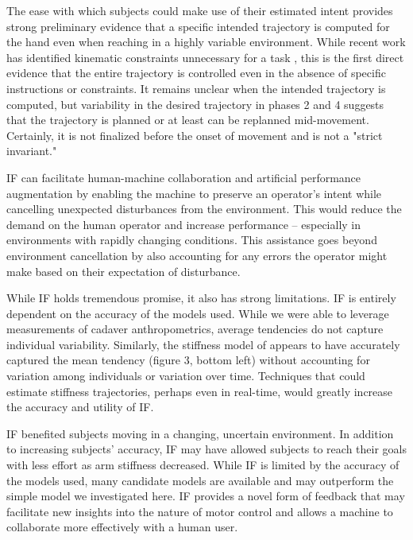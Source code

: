 \documentclass{frontiersSCNS} %
\begin{document}
The ease with which subjects could make use of their estimated intent provides strong preliminary evidence that a specific intended trajectory is computed for the hand even when reaching in a highly variable environment. While recent work has identified kinematic constraints unnecessary for a task \citep{mistry2013optimal}, this is the first direct evidence that the entire trajectory is controlled even in the absence of specific instructions or constraints. It remains unclear when the intended trajectory is computed, but variability in the desired trajectory in phases 2 and 4 suggests that the trajectory is planned or at least can be replanned mid-movement. Certainly, it is not finalized before the onset of movement and is not a "strict invariant."

IF can facilitate human-machine collaboration and artificial performance augmentation by enabling the machine to preserve an operator's intent while cancelling unexpected disturbances from the environment. This would reduce the demand on the human operator and increase performance -- especially in environments with rapidly changing conditions. This assistance goes beyond environment cancellation by also accounting for any errors the operator might make based on their expectation of disturbance.

While IF holds tremendous promise, it also has strong limitations. IF is entirely dependent on the accuracy of the models used. While we were able to leverage measurements of cadaver anthropometrics, average tendencies do not capture individual variability. Similarly, the stiffness model of \cite{shadmehr1994adaptive} appears to have accurately captured the mean tendency (figure 3, bottom left) without accounting for variation among individuals or variation over time. Techniques that could estimate stiffness trajectories, perhaps even in real-time, would greatly increase the accuracy and utility of IF.

IF benefited subjects moving in a changing, uncertain environment. In addition to increasing subjects' accuracy, IF may have allowed subjects to reach their goals with less effort as arm stiffness decreased. While IF is limited by the accuracy of the models used, many candidate models are available and may outperform the simple model we investigated here. IF provides a novel form of feedback that may facilitate new insights into the nature of motor control and allows a machine to collaborate more effectively with a human user.
\end{document}
